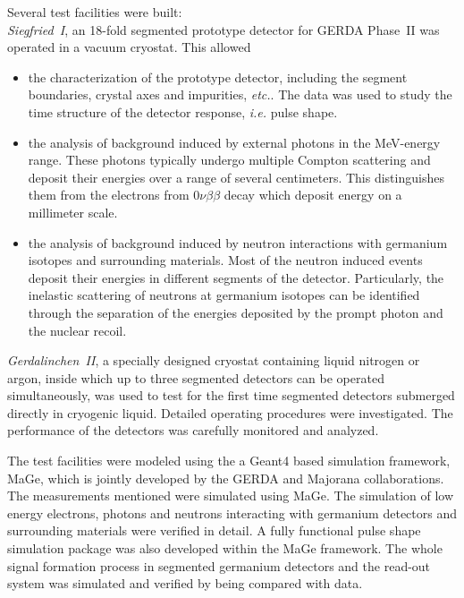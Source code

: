 Several test facilities were built:\\
\emph{Siegfried~I}, an 18-fold segmented prototype detector for GERDA Phase~II was operated in a vacuum cryostat. This allowed
\begin{itemize}
\item the characterization of the prototype detector, including the segment boundaries, crystal axes and impurities, \textit{etc.}. The data was used to study the time structure of the detector response, \textit{i.e.} pulse shape. 
\item the analysis of background induced by external photons in the MeV-energy range. These photons typically undergo multiple Compton scattering and deposit their energies over a range of several centimeters. This distinguishes them from the electrons from $0\nu\beta\beta$ decay which deposit energy on a millimeter scale.
\item the analysis of background induced by neutron interactions with germanium isotopes and surrounding materials. Most of the neutron induced events deposit their energies in different segments of the detector. Particularly, the inelastic scattering of neutrons at germanium isotopes can be identified through the separation of the energies deposited by the prompt photon and the nuclear recoil.
\end{itemize}
\emph{Gerdalinchen~II}, a specially designed cryostat containing liquid nitrogen or argon, inside which up to three segmented detectors can be operated simultaneously, was used to test for the first time segmented detectors submerged directly in cryogenic liquid. Detailed operating procedures were investigated. The performance of the detectors was carefully monitored and analyzed.

The test facilities were modeled using the  a Geant4 based simulation framework, MaGe, which is jointly developed by the GERDA and Majorana collaborations. The measurements mentioned were simulated using MaGe. The simulation of low energy electrons, photons and neutrons interacting with germanium detectors and surrounding materials were verified in detail. A fully functional pulse shape simulation package was also developed within the MaGe framework. The whole signal formation process in segmented germanium detectors and the read-out system was simulated and verified by being compared with data. 

